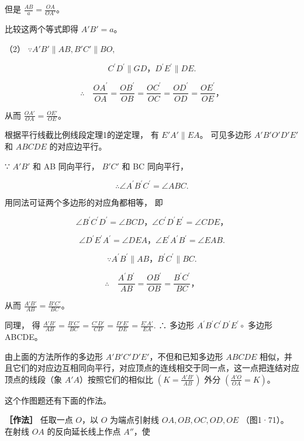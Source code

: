 但是 \(\frac{AB}{a} = \frac{OA}{OA'}\)。

比较这两个等式即得 \(A'B' = a\)。

（2） \(\because A'B' \parallel AB, B'C' \parallel BO,\)

\[
C ^ {\prime} D ^ {\prime} \parallel G D\text{，} D ^ {\prime} E ^ {\prime} \parallel D E.
\]

\[
\therefore \quad \frac {O A ^ {\prime}}{O A} = \frac {O B ^ {\prime}}{O B} = \frac {O C ^ {\prime}}{O C} = \frac {O D ^ {\prime}}{O D} = \frac {O E ^ {\prime}}{O E}\text{，}
\]

从而 \(\frac{OA'}{OA} = \frac{OE'}{OE}\)。

根据平行线截比例线段定理1的逆定理， 有 \(E'A' \parallel EA\)。
可见多边形 \(A'B'O'D'E'\) 和 \(ABCDE\) 的对应边平行。

∵ \(A'B'\) 和 AB 同向平行， \(B'C'\) 和 BC 同向平行，

\[
\therefore \angle A ^ {\prime} B ^ {\prime} C ^ {\prime} = \angle A B C.
\]

用同法可证两个多边形的对应角都相等， 即

\[
\angle B ^ {\prime} C ^ {\prime} D ^ {\prime} = \angle B C D\text{，} \angle C ^ {\prime} D ^ {\prime} E ^ {\prime} = \angle C D E\text{，}
\]

\[
\angle D ^ {\prime} E ^ {\prime} A ^ {\prime} = \angle D E A\text{，} \angle E ^ {\prime} A ^ {\prime} B ^ {\prime} = \angle E A B.
\]

\[
\because A ^ {\prime} B ^ {\prime} \parallel A B\text{，} B ^ {\prime} C ^ {\prime} \parallel B C.
\]

\[
\therefore \quad \frac {A ^ {\prime} B ^ {\prime}}{A B} = \frac {O B ^ {\prime}}{O B} = \frac {B ^ {\prime} C ^ {\prime}}{B C}\text{，}
\]

从而 \(\frac{A'B'}{AB} = \frac{B'C'}{BC}\)。

同理， 得
\(\frac{A'B'}{AB}=\frac{B'C'}{BC}=\frac{C'D'}{CD}=\frac{D'E'}{DE}=\frac{E'A'}{EA}.\)
∴ 多边形 \(A^{\prime}B^{\prime}C^{\prime}D^{\prime}E^{\prime}\circ\)
多边形 ABCDE。

由上面的方法所作的多边形 \(A'B'C'D'E'\)，不但和已知多边形 \(ABCDE\)
相似，并且它们的对应边互相同向平行，对应顶点的连线相交于同一点，这一点把连结对应顶点的线段（象
\(A'A\)）按照它们的相似比 \(\left(K = \frac{A'B'}{AB}\right)\) 外分
\(\left(\frac{A'O}{OA} = K\right)\)。

这个作图题还有下面的作法。

\textbf{［作法］} 任取一点 \(O\)，以 \(O\) 为端点引射线
\(OA, OB, OC, OD, OE\) （图1·71）。 在射线 \(OA\) 的反向延长线上作点
\(A''\)，使

